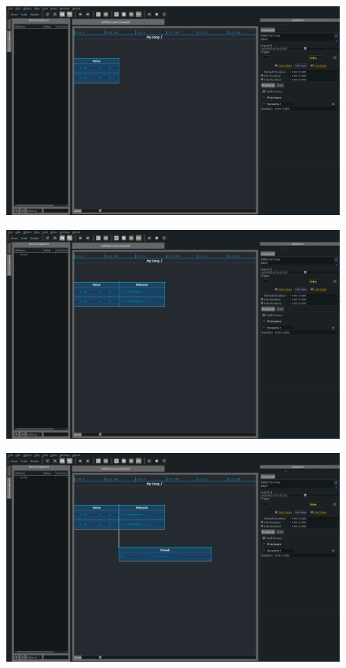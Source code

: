 \documentclass[draft]{beamer}
\begin{document}
\begin{frame} 
    \Large
    \begin{figure}
        \centering
        \includegraphics[width=\textwidth]{images/screens/1.png}
    \end{figure}
\end{frame}
\begin{frame} 
    \Large
    \begin{figure}
        \centering
        \includegraphics[width=\textwidth]{images/screens/2.png}
    \end{figure}
\end{frame}
\begin{frame} 
    \Large
    \begin{figure}
        \centering
        \includegraphics[width=\textwidth]{images/screens/3.png}
    \end{figure}
\end{frame}
\end{document}
